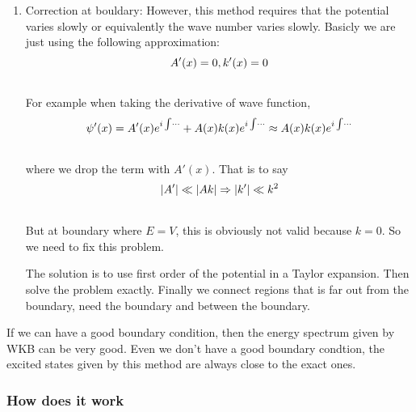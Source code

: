 \documentclass[letterpaper,10pt,english]{sphinxmanual}
\begin{document}
\begin{enumerate}
\item {} 
Correction at bouldary:
However, this method requires that the potential varies slowly or equivalently the wave number varies slowly. Basicly we are just using the following approximation:
\begin{gather}
\begin{split}A'(x) = 0, k'(x) = 0\end{split}\notag\\\begin{split}\end{split}\notag
\end{gather}
For example when taking the derivative of wave function,
\begin{gather}
\begin{split}\psi'(x) = A'(x) e^{i\int \cdots} + A(x) k(x) e^{i\int \cdots} \approx A(x) k(x) e^{i\int \cdots}\end{split}\notag\\\begin{split}\end{split}\notag
\end{gather}
where we drop the term with $A'(x)$. That is to say
\begin{gather}
\begin{split}|A'|\ll |A k| \Rightarrow |k'| \ll k^2\end{split}\notag\\\begin{split}\end{split}\notag
\end{gather}
But at boundary where $E = V$, this is obviously not valid because $k=0$. So we need to fix this problem.

The solution is to use first order of the potential in a Taylor expansion. Then solve the problem exactly. Finally we connect regions that is far out from the boundary, need the boundary and between the boundary.

\end{enumerate}

If we can have a good boundary condition, then the energy spectrum given by WKB can be very good. Even we don't have a good boundary condtion, the excited states given by this method are always close to the exact ones.


\subsubsection{How does it work}
\label{approx:how-does-it-work}
\end{document}
